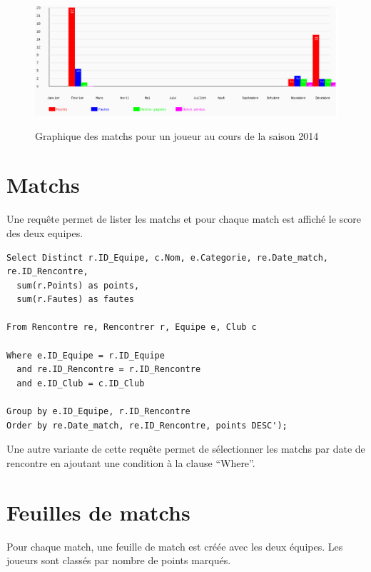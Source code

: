 \documentclass[a4paper»,8pt,french,fleqn]{report}
\begin{document}
\begin{figure}[h]
  \centering
    \includegraphics[scale=0.5]{graphe.png}
    \label{fig:graph}
    \caption{Graphique des matchs pour un joueur au cours de la saison 2014}
\end{figure}


\section{Matchs}
Une requête permet de lister les matchs et pour chaque match est affiché le score des deux equipes.

\begin{lstlisting}
Select Distinct r.ID_Equipe, c.Nom, e.Categorie, re.Date_match, re.ID_Rencontre,
  sum(r.Points) as points, 
  sum(r.Fautes) as fautes 

From Rencontre re, Rencontrer r, Equipe e, Club c

Where e.ID_Equipe = r.ID_Equipe
  and re.ID_Rencontre = r.ID_Rencontre
  and e.ID_Club = c.ID_Club

Group by e.ID_Equipe, r.ID_Rencontre
Order by re.Date_match, re.ID_Rencontre, points DESC');
\end{lstlisting}

Une autre variante de cette requête permet de sélectionner les matchs par date de rencontre en ajoutant une condition à la clause ``Where''.


\section{Feuilles de matchs}

Pour chaque match, une feuille de match est créée avec les deux équipes. Les joueurs sont classés par nombre de points marqués.
\end{document}
